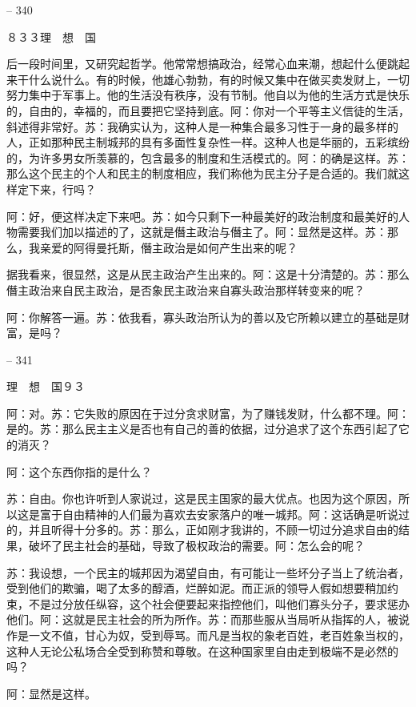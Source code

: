 \documentclass[11pt,oneside]{book}
\begin{document}
\begin{common-format}
    

-- 340

    ８３３理　想　国

    后一段时间里，又研究起哲学。他常常想搞政治，经常心血来潮，想起什么便跳起来干什么说什么。有的时候，他雄心勃勃，有的时候又集中在做买卖发财上，一切努力集中于军事上。他的生活没有秩序，没有节制。他自以为他的生活方式是快乐的，自由的，幸福的，而且要把它坚持到底。阿：你对一个平等主义信徒的生活，斜述得非常好。苏：我确实认为，这种人是一种集合最多习性于一身的最多样的人，正如那种民主制城邦的具有多面性复杂性一样。这种人也是华丽的，五彩缤纷的，为许多男女所羡慕的，包含最多的制度和生活模式的。阿：的确是这样。苏：那么这个民主的个人和民主的制度相应，我们称他为民主分子是合适的。我们就这样定下来，行吗？

    阿：好，便这样决定下来吧。苏：如今只剩下一种最美好的政治制度和最美好的人物需要我们加以描述的了，这就是僭主政治与僭主了。阿：显然是这样。苏：那么，我亲爱的阿得曼托斯，僭主政治是如何产生出来的呢？

    据我看来，很显然，这是从民主政治产生出来的。阿：这是十分清楚的。苏：那么僭主政治来自民主政治，是否象民主政治来自寡头政治那样转变来的呢？

    阿：你解答一遍。苏：依我看，寡头政治所认为的善以及它所赖以建立的基础是财富，是吗？

    

-- 341

    理　想　国９３

    阿：对。苏：它失败的原因在于过分贪求财富，为了赚钱发财，什么都不理。阿：是的。苏：那么民主主义是否也有自己的善的依据，过分追求了这个东西引起了它的消灭？

    阿：这个东西你指的是什么？

    苏：自由。你也许听到人家说过，这是民主国家的最大优点。也因为这个原因，所以这是富于自由精神的人们最为喜欢去安家落户的唯一城邦。阿：这话确是听说过的，并且听得十分多的。苏：那么，正如刚才我讲的，不顾一切过分追求自由的结果，破坏了民主社会的基础，导致了极权政治的需要。阿：怎么会的呢？

    苏：我设想，一个民主的城邦因为渴望自由，有可能让一些坏分子当上了统治者，受到他们的欺骗，喝了太多的醇酒，烂醉如泥。而正派的领导人假如想要稍加约束，不是过分放任纵容，这个社会便要起来指控他们，叫他们寡头分子，要求惩办他们。阿：这就是民主社会的所为所作。苏：而那些服从当局听从指挥的人，被说作是一文不值，甘心为奴，受到辱骂。而凡是当权的象老百姓，老百姓象当权的，这种人无论公私场合全受到称赞和尊敬。在这种国家里自由走到极端不是必然的吗？

    阿：显然是这样。


\end{common-format}
\end{document}

